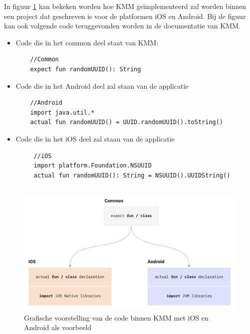 In figuur \ref{fig:SVZkmm-code} kan bekeken worden hoe KMM geïmplementeerd zal worden binnen een project dat geschreven is voor de platformen iOS en Android. Bij de figuur kan ook volgende code teruggevonden worden in de documentatie van KMM.\autocite{Kotlin2021MP}

\begin{itemize}
    \item Code die in het common deel staat van KMM:
\begin{lstlisting}
    //Common
    expect fun randomUUID(): String
\end{lstlisting}
    \item Code die in het Android deel zal staan van de applicatie
\begin{lstlisting}
    //Android
    import java.util.*
    actual fun randomUUID() = UUID.randomUUID().toString()
\end{lstlisting}
     \item Code die in het iOS deel zal staan van de applicatie
 \begin{lstlisting}
     //iOS
     import platform.Foundation.NSUUID
     actual fun randomUUID(): String = NSUUID().UUIDString()
     
 \end{lstlisting}
\end{itemize}

\begin{figure}[h!]
    \includegraphics[width=\linewidth]{img/kmm-code.png}
    \caption{Grafische voorstelling van de code binnen KMM met iOS en Android als voorbeeld \autocite{Kotlin2021MP}}
    \label{fig:SVZkmm-code}
\end{figure}



\section{}
\label{sec:SVZKMMvsandere}

